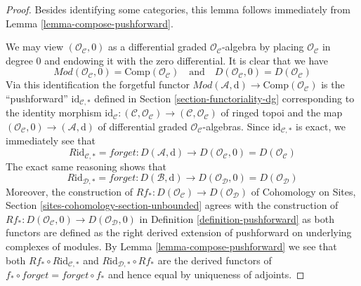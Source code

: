\documentclass[10pt,a4paper]{amsart}
\theoremstyle{plain}
\theoremstyle{definition}
\theoremstyle{remark}
\numberwithin{equation}{subsection}
\begin{document}
\begin{proof}
Besides identifying some categories, this lemma follows immediately
from Lemma \ref{lemma-compose-pushforward}.

\medskip\noindent
We may view $(\mathcal{O}_\mathcal{C}, 0)$ as a differential graded
$\mathcal{O}_\mathcal{C}$-algebra by placing $\mathcal{O}_\mathcal{C}$
in degree $0$ and endowing it with the zero differential. It is clear
that we have
$$
\textit{Mod}(\mathcal{O}_\mathcal{C}, 0) =
\text{Comp}(\mathcal{O}_\mathcal{C})
\quad\text{and}\quad
D(\mathcal{O}_\mathcal{C}, 0) = D(\mathcal{O}_\mathcal{C})
$$
Via this identification the forgetful functor
$\textit{Mod}(\mathcal{A}, \text{d}) \to
\text{Comp}(\mathcal{O}_\mathcal{C})$
is the ``pushforward'' $\text{id}_{\mathcal{C}, *}$
defined in Section \ref{section-functoriality-dg}
corresponding to the identity morphism
$\text{id}_\mathcal{C} : (\mathcal{C}, \mathcal{O}_\mathcal{C}) \to
(\mathcal{C}, \mathcal{O}_\mathcal{C})$ of ringed topoi and the
map $(\mathcal{O}_\mathcal{C}, 0) \to (\mathcal{A}, \text{d})$
of differential graded $\mathcal{O}_\mathcal{C}$-algebras.
Since $\text{id}_{\mathcal{C}, *}$ is exact, we immediately see that
$$
R\text{id}_{\mathcal{C}, *} = forget :
D(\mathcal{A}, \text{d}) \longrightarrow
D(\mathcal{O}_\mathcal{C}, 0) = D(\mathcal{O}_\mathcal{C})
$$
The exact same reasoning shows that
$$
R\text{id}_{\mathcal{D}, *} = forget :
D(\mathcal{B}, \text{d}) \longrightarrow
D(\mathcal{O}_\mathcal{D}, 0) = D(\mathcal{O}_\mathcal{D})
$$
Moreover, the construction of
$Rf_* : D(\mathcal{O}_\mathcal{C}) \to D(\mathcal{O}_\mathcal{D})$
of Cohomology on Sites, Section \ref{sites-cohomology-section-unbounded}
agrees with the construction of
$Rf_* : D(\mathcal{O}_\mathcal{C}, 0) \to D(\mathcal{O}_\mathcal{D}, 0)$
in Definition \ref{definition-pushforward}
as both functors are defined as the right derived extension of
pushforward on underlying complexes of modules.
By Lemma \ref{lemma-compose-pushforward} we see that both
$Rf_* \circ R\text{id}_{\mathcal{C}, *}$ and
$R\text{id}_{\mathcal{D}, *} \circ Rf_*$ are the derived functors
of $f_* \circ forget = forget \circ f_*$ and hence equal
by uniqueness of adjoints.
\end{proof}
\end{document}
